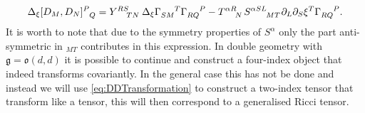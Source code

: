\begin{equation}\label{eq:DDTransformation}
    \Delta_\xi [D_M,D_N]\tensor{}{^P_Q}= \tensor{Y}{^{RS}_{TN}}\Delta_\xi \tensor{\Gamma}{_{SM}^T}\tensor{\Gamma}{_{RQ}^P}-\tensor{T}{^{\alpha R}_N}\tensor{S}{^{\alpha SL}_{MT}}\pd_L\pd_S\xi^T\tensor{\Gamma}{_{RQ}^P}.
\end{equation}
It is worth to note that due to the symmetry properties of $S^\alpha$ only the part anti-symmetric in $_{MT}$ contributes in this expression. In double geometry with $\mathfrak{g}=\mathfrak{o}(d,d)$ it is possible to continue and construct a four-index object that indeed transforms covariantly. In the general case this has not be done and instead we will use \eqref{eq:DDTransformation} to construct a two-index tensor that transform like a tensor, this will then correspond to a generalised Ricci tensor. 

